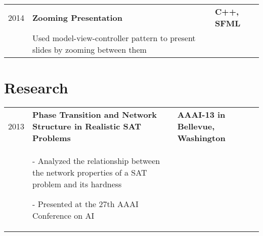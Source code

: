 \documentclass[letterpaper,10pt]{article}
\begin{document}
\begin{minipage}[t][0em][t]{0.8\textwidth}
\begin{tabular}{p{} p{} p{}}
  
  {2014} & \textbf{Zooming Presentation} & \textbf{\small C++, SFML}\\
  & {Used model-view-controller pattern to present slides by zooming between them} & \\
\end{tabular}



  


\section*{\huge Research}
\begin{tabular}{p{} p{} p{}}
  
  {2013} & \textbf{Phase Transition and Network Structure in Realistic SAT Problems} & \textbf{\small AAAI-13 in Bellevue, Washington}\\
  & {- Analyzed the relationship between the network properties of a SAT problem and its hardness

- Presented at the 27th AAAI Conference on AI} & \\
\end{tabular}

%   


  


\end{minipage}\hspace{0.5cm}
\end{document}

